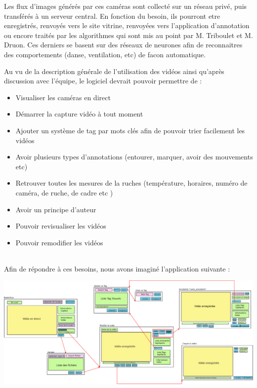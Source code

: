 \documentclass[11pt,french,a4paper]{report}
\begin{document}
  Les flux d'images générés par ces caméras sont collecté sur un réseau privé,
  puis transférés à un serveur central. En fonction du besoin, ils pourront
  etre enregistrés, renvoyés vers le site vitrine, renvoyées vers l'application d'annotation
  ou encore traités par les algorithmes qui sont mis au point par M. Triboulet et M. Druon. 
  Ces derniers se basent sur des réseaux de neurones afin de reconnaitres des comportements
  (danse, ventilation, etc) de facon automatique.


Au vu de la description générale de l'utilisation des vidéos ainsi qu'après discussion avec l'équipe, le logiciel devrait 
pouvoir permettre de : \\
\begin{itemize}
    \item Visualiser les caméras en direct
    \item Démarrer la capture vidéo à tout moment 
    \item Ajouter un système de tag par mots clés afin de pouvoir trier facilement les vidéos 
    \item Avoir plusieurs types d'annotations (entourer, marquer, avoir des mouvements etc) 
    \item Retrouver toutes les mesures de la ruches (température, horaires, numéro de caméra, de ruche, de cadre etc )  
    \item Avoir un principe d'auteur 
    \item Pouvoir revisualiser les vidéos 
    \item Pouvoir remodifier les vidéos 
\end{itemize} \\
Afin de répondre à ces besoins, nous avons imaginé l'application suivante : 
\begin{center}
\includegraphics[scale=0.21]{../images/dia/schema_interface.png}
\end{center}
    
\end{document}
